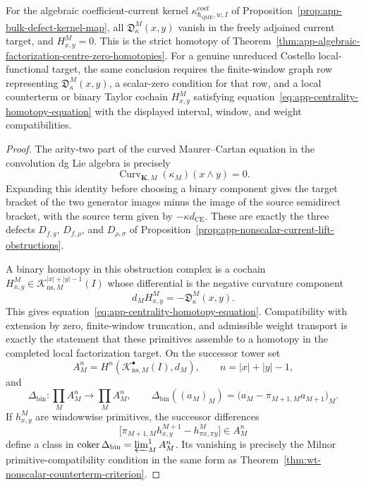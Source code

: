 \begin{thm}
  For the algebraic coefficient-current kernel
  \(\kappa^{\mathrm{coef}}_{\hbar_{\mathrm{QME}},w,I}\) of
  Proposition~\ref{prop:app-bulk-defect-kernel-map}, all
  \(\mathfrak D^M_\kappa(x,y)\) vanish in the freely adjoined current
  target, and \(H^M_{x,y}=0\).  This is the strict
  homotopy of
  Theorem~\ref{thm:app-algebraic-factorization-centre-zero-homotopies}.
  For a genuine unreduced Costello local-functional target, the same
  conclusion requires the finite-window graph row representing
  \(\mathfrak D^M_\kappa(x,y)\), a scalar-zero condition for that row, and a
  local counterterm or binary Taylor cochain \(H^M_{x,y}\) satisfying
  equation~\eqref{eq:app-centrality-homotopy-equation} with the displayed
  interval, window, and weight compatibilities.
\end{thm}

\begin{proof}
  The arity-two part of the curved Maurer--Cartan equation in the
  convolution dg Lie algebra is precisely
  \[
    \operatorname{Curv}_{\mathbf K,M}(\kappa_M)(x\wedge y)=0.
  \]
  Expanding this identity before choosing a binary component gives the
  target bracket of the two generator images minus the image of the source
  semidirect bracket, with the source term given by
  \(-\kappa d_{\mathrm{CE}}\).  These are exactly the three defects
  \(D_{f,g}\), \(D_{f,\rho}\), and \(D_{\rho,\sigma}\) of
  Proposition~\ref{prop:app-nonscalar-current-lift-obstructions}.

  A binary homotopy in this obstruction complex is a cochain
  \(H^M_{x,y}\in
  \mathcal K^{|x|+|y|-1}_{\mathrm{ns},M}(I)\) whose differential is the
  negative curvature component
  \[
    d_MH^M_{x,y}=-\mathfrak D^M_\kappa(x,y).
  \]
  This gives
  equation~\eqref{eq:app-centrality-homotopy-equation}.  Compatibility with
  extension by zero, finite-window truncation, and admissible weight
  transport is exactly the statement that these primitives assemble to a
  homotopy in the completed local factorization target.  On the
  successor tower set
  \[
    A^n_M=
    H^{n}\!\left(\mathcal K^\bullet_{\mathrm{ns},M}(I),d_M\right),
    \qquad n=|x|+|y|-1 ,
  \]
  and
  \[
    \Delta_{\mathrm{bin}}\colon \prod_M A^n_M\longrightarrow
    \prod_M A^n_M,\qquad
    \Delta_{\mathrm{bin}}((a_M)_M)
      =
      \bigl(a_M-\pi_{M+1,M}a_{M+1}\bigr)_M .
  \]
  If \(h^M_{x,y}\) are windowwise primitives, the successor differences
  \[
    \bigl[\pi_{M+1,M}h^{M+1}_{x,y}-h^M_{\pi x,\pi y}\bigr]\in A^n_M
  \]
  define a class in
  \(\operatorname{coker}\Delta_{\mathrm{bin}}
  =\varprojlim\nolimits^1_M A^n_M\).  Its vanishing is precisely the
  Milnor primitive-compatibility condition in the same form as
  Theorem~\ref{thm:wt-nonscalar-counterterm-criterion}.


\end{proof}
